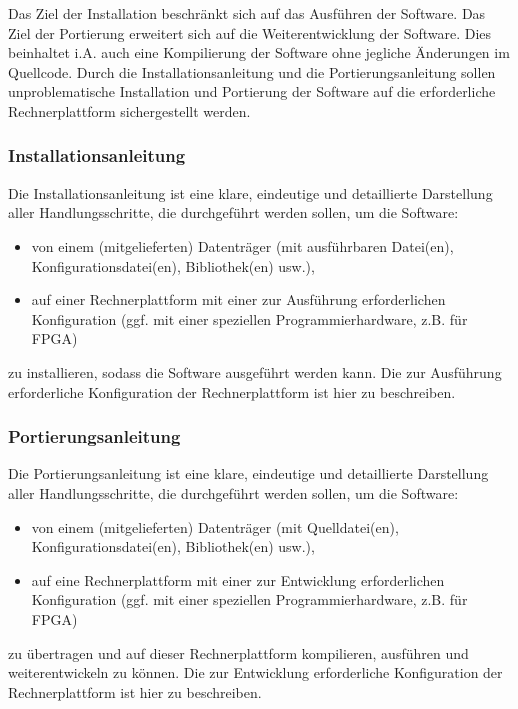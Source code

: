 Das Ziel der Installation beschränkt sich auf das Ausführen der Software. Das Ziel der Portierung erweitert sich auf die Weiterentwicklung der Software. Dies beinhaltet i.A. auch eine Kompilierung der Software ohne jegliche Änderungen im Quellcode. Durch die Installationsanleitung und die Portierungsanleitung sollen unproblematische Installation und Portierung der Software auf die erforderliche Rechnerplattform sichergestellt werden.

\subsubsection*{Installationsanleitung}

Die Installationsanleitung ist eine klare, eindeutige und detaillierte Darstellung aller Handlungsschritte, die durchgeführt werden sollen, um die Software:

\begin{itemize}
  \item von einem (mitgelieferten) Datenträger (mit ausführbaren Datei(en), Konfigurationsdatei(en), Bibliothek(en) usw.),
  \item auf einer Rechnerplattform mit einer zur Ausführung erforderlichen Konfiguration (ggf. mit einer speziellen Programmierhardware, z.B. für FPGA)
\end{itemize}

zu installieren, sodass die Software ausgeführt werden kann. Die zur Ausführung erforderliche Konfiguration der Rechnerplattform ist hier zu beschreiben.

\subsubsection*{Portierungsanleitung}

Die Portierungsanleitung ist eine klare, eindeutige und detaillierte Darstellung aller Handlungsschritte, die durchgeführt werden sollen, um die Software:

\begin{itemize}
  \item von einem (mitgelieferten) Datenträger (mit Quelldatei(en), Konfigurationsdatei(en), Bibliothek(en) usw.),
  \item auf eine Rechnerplattform mit einer zur Entwicklung erforderlichen Konfiguration (ggf. mit einer speziellen Programmierhardware, z.B. für FPGA)
\end{itemize}

zu übertragen und auf dieser Rechnerplattform kompilieren, ausführen und weiterentwickeln zu können. Die zur Entwicklung erforderliche Konfiguration der Rechnerplattform ist hier zu beschreiben.

